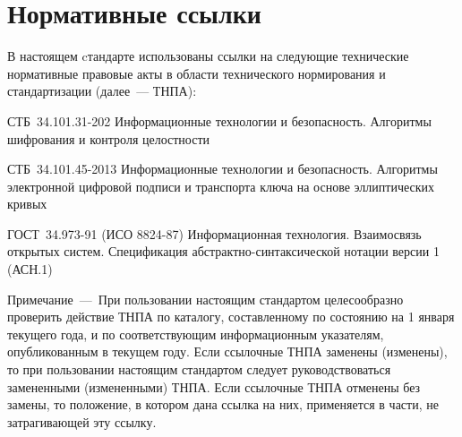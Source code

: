 \chapter{Нормативные ссылки}

В настоящем cтандарте использованы ссылки на следующие 
технические нормативные правовые акты в области 
технического нормирования и стандартизации (далее~--- ТНПА):

СТБ~34.101.31-202 Информационные технологии и безопасность. 
Алгоритмы шифрования и контроля целостности

СТБ~34.101.45-2013 Информационные технологии и безопасность. 
Алгоритмы электронной цифровой подписи и транспорта ключа на основе
эллиптических кривых

ГОСТ~34.973-91 (ИСО 8824-87) Информационная технология. Взаимосвязь
открытых систем. Спецификация абстрактно-синтаксической нотации
версии 1 (АСН.1)

\begin{note}
Примечание~---~При пользовании настоящим стандартом целесообразно проверить
действие ТНПА по каталогу, составленному по состоянию на 1 января текущего года,
и по соответствующим информационным указателям, опубликованным в текущем году.
%
Если ссылочные ТНПА заменены (изменены), то при пользовании настоящим стандартом
следует руководствоваться замененными (измененными) ТНПА. Если ссылочные ТНПА
отменены без замены, то положение, в котором дана ссылка на них, применяется в
части, не затрагивающей эту ссылку.
\end{note}

